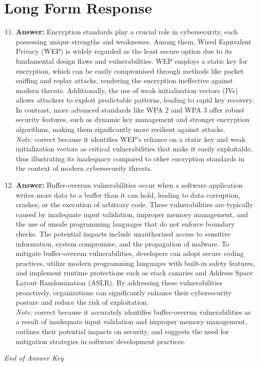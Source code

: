 \documentclass[12pt]{article}
\begin{document}
\section*{Long Form Response}
\begin{enumerate}[label=\arabic*.]
\setcounter{enumi}{10}
\item \textbf{Answer:} Encryption standards play a crucial role in cybersecurity, each possessing unique strengths and weaknesses. Among them, Wired Equivalent Privacy (WEP) is widely regarded as the least secure option due to its fundamental design flaws and vulnerabilities. WEP employs a static key for encryption, which can be easily compromised through methods like packet sniffing and replay attacks, rendering the encryption ineffective against modern threats. Additionally, the use of weak initialization vectors (IVs) allows attackers to exploit predictable patterns, leading to rapid key recovery. In contrast, more advanced standards like WPA 2 and WPA 3 offer robust security features, such as dynamic key management and stronger encryption algorithms, making them significantly more resilient against attacks.
\\ \textit{Note:} correct because it identifies WEP's reliance on a static key and weak initialization vectors as critical vulnerabilities that make it easily exploitable, thus illustrating its inadequacy compared to other encryption standards in the context of modern cybersecurity threats.
\item \textbf{Answer:} Buffer-overrun vulnerabilities occur when a software application writes more data to a buffer than it can hold, leading to data corruption, crashes, or the execution of arbitrary code. These vulnerabilities are typically caused by inadequate input validation, improper memory management, and the use of unsafe programming languages that do not enforce boundary checks. The potential impacts include unauthorized access to sensitive information, system compromise, and the propagation of malware. To mitigate buffer-overrun vulnerabilities, developers can adopt secure coding practices, utilize modern programming languages with built-in safety features, and implement runtime protections such as stack canaries and Address Space Layout Randomization (ASLR). By addressing these vulnerabilities proactively, organizations can significantly enhance their cybersecurity posture and reduce the risk of exploitation.
\\ \textit{Note:} correct because it accurately identifies buffer-overrun vulnerabilities as a result of inadequate input validation and improper memory management, outlines their potential impacts on security, and suggests the need for mitigation strategies in software development practices.
\end{enumerate}

\vfill
\noindent\textit{End of Answer Key}
\end{document}
